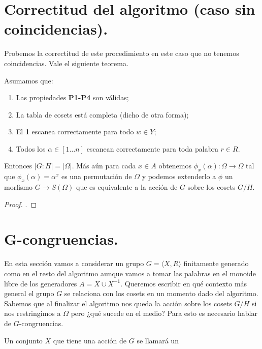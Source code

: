 \documentclass[tesis.tex]{subfiles}
\newcommand{\In}{[1 \dots n]}
\begin{document}
\section{Correctitud del algoritmo (caso sin coincidencias).}

Probemos la correctitud de este procedimiento en este caso que no tenemos coincidencias.
Vale el siguiente teorema.
\begin{teo}
	Asumamos que:
	\begin{enumerate}
		\item Las propiedades \textbf{P1-P4} son válidas;
		\item La tabla de cosets está completa (dicho de otra forma);
		\item El \textbf{1} escanea correctamente para todo $w \in Y$;
		\item Todos los $\alpha \in \In$ escanean correctamente para toda palabra $r \in R$.
	\end{enumerate}
	Entonces $|G:H| = |\Omega|$.
	Más aún para cada $x \in A$ obtenemos $\phi_x(\alpha) : \Omega \to \Omega$ tal que $\phi_x(\alpha) = \alpha^x$ es una permutación de $\Omega$ y podemos extenderlo a $\phi$ un morfismo $G \to S(\Omega)$ que es equivalente a la acción de $G$ sobre los cosets $G/H$.
\end{teo}
\begin{proof}
	.
\end{proof}


\section{G-congruencias.}
En esta sección vamos a considerar un grupo $G = \langle X, R \rangle$ finitamente generado como en el resto del algoritmo aunque vamos a tomar las palabras en el monoide libre de los generadores $A = X \cup X^{-1}$.
Queremos escribir en qué contexto más general el grupo $G$ se relaciona con los cosets en un momento dado del algoritmo. 
Sabemos que al finalizar el algoritmo nos queda la acción sobre los cosets $G/H$ si nos restringimos a $\Omega$ pero ¿qué sucede en el medio?
Para esto es necesario hablar de $G$-congruencias.
\begin{deff}
    Un conjunto $X$ que tiene una acción de $G$ se llamará un 
\end{deff}

\end{document}
